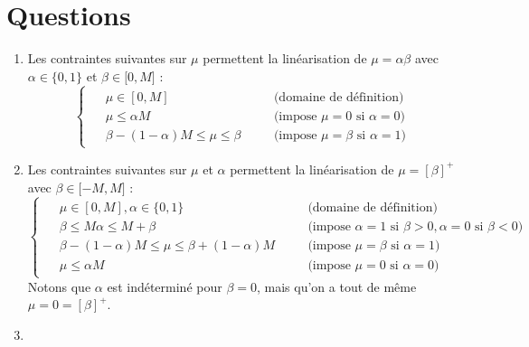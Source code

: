 \documentclass[a4paper,12pt]{article}
\begin{document}
\section{Questions}
\begin {enumerate}
\item { 
    Les contraintes suivantes sur $\mu$ permettent la linéarisation de $\mu = \alpha \beta$ avec $\alpha \in \lbrace 0,1 \rbrace$ et $\beta \in \lbrack 0, M \rbrack$ : 
    \begin{equation*}
        \begin{cases}
            \begin{alignedat}{2}
                &\mu \in [0,M] && \quad \text{(domaine de définition)}  \\ 
                &\mu \leq \alpha M && \quad  \text{(impose } \mu = 0 \text{ si }  \alpha = 0 \text{)}\\
                &\beta - (1 - \alpha)M \leq \mu \leq \beta && \quad \text{(impose } \mu = \beta \text{ si }  \alpha = 1 \text{)}
            \end{alignedat}
        \end{cases}
    \end{equation*}
    }
\item {
    Les contraintes suivantes sur $\mu$ et $\alpha$ permettent la linéarisation de $\mu = [\beta]^{+}$ avec $\beta \in \lbrack -M, M \rbrack$ : 
    \begin{equation*}
        \begin{cases}
            \begin{alignedat}{2}
                &\mu \in [0,M], \alpha \in \lbrace 0,1 \rbrace && \quad \text{(domaine de définition)} \\ 
                &\beta \leq M \alpha \leq M + \beta && \quad \text{(impose } \alpha = 1 \text{ si }  \beta > 0, \alpha = 0 \text{ si } \beta < 0 \text{)} \\
                &\beta - (1-\alpha)M \leq \mu \leq \beta + (1-\alpha)M && \quad \text{(impose } \mu = \beta \text{ si }  \alpha = 1 \text{)} \\
                &\mu \leq \alpha M && \quad \text{(impose } \mu = 0 \text{ si }  \alpha = 0 \text{)}
            \end{alignedat}
        \end{cases}
    \end{equation*}
    Notons que $\alpha$ est indéterminé pour $\beta = 0$, mais qu'on a tout de même $\mu = 0= [\beta]^{+}$.
}
\item {
}
\end{enumerate}
\end{document}
